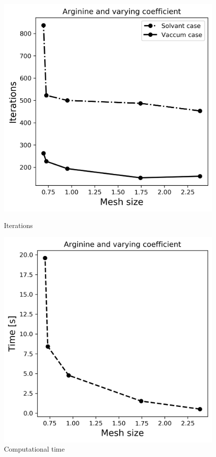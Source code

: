 \begin{figure}[!htb]
  \includegraphics[width=\linewidth]{FEM_BEM_Arginine_varying_coeff_iter.png}
  \caption{Iterations}
\endminipage\hfill
{}%
  \includegraphics[width=\linewidth]{FEM_BEM_Arginine_varying_coeff_time.png}
  \caption{Computational time}
\endminipage
\end{figure}
